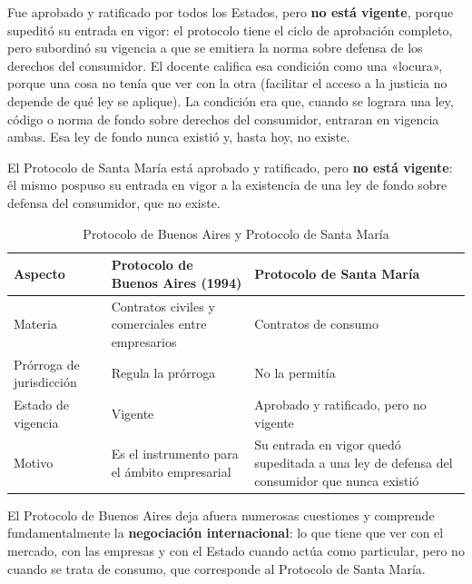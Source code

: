 \documentclass[12pt,oneside]{book}
\begin{document}

Fue aprobado y ratificado por todos los Estados, pero \textbf{no está vigente}, porque supeditó su entrada en vigor: el protocolo tiene el ciclo de aprobación completo, pero subordinó su vigencia a que se emitiera la norma sobre defensa de los derechos del consumidor. El docente califica esa condición como una «locura», porque una cosa no tenía que ver con la otra (facilitar el acceso a la justicia no depende de qué ley se aplique). La condición era que, cuando se lograra una ley, código o norma de fondo sobre derechos del consumidor, entraran en vigencia ambas. Esa ley de fondo nunca existió y, hasta hoy, no existe.

\begin{important}
El Protocolo de Santa María está aprobado y ratificado, pero \textbf{no está vigente}: él mismo pospuso su entrada en vigor a la existencia de una ley de fondo sobre defensa del consumidor, que no existe.
\end{important}

\begin{table}[H]
\centering
\caption{Protocolo de Buenos Aires y Protocolo de Santa María}
\small
\begin{tabularx}{\textwidth}{>{\raggedright\arraybackslash}p{}YY}
\toprule
\textbf{Aspecto} & \textbf{Protocolo de Buenos Aires (1994)} & \textbf{Protocolo de Santa María} \\
\midrule
Materia & Contratos civiles y comerciales entre empresarios & Contratos de consumo \\
Prórroga de jurisdicción & Regula la prórroga & No la permitía \\
Estado de vigencia & Vigente & Aprobado y ratificado, pero no vigente \\
Motivo & Es el instrumento para el ámbito empresarial & Su entrada en vigor quedó supeditada a una ley de defensa del consumidor que nunca existió \\
\bottomrule
\end{tabularx}
\end{table}

El Protocolo de Buenos Aires deja afuera numerosas cuestiones y comprende fundamentalmente la \textbf{negociación internacional}: lo que tiene que ver con el mercado, con las empresas y con el Estado cuando actúa como particular, pero no cuando se trata de consumo, que corresponde al Protocolo de Santa María.
\end{document}
